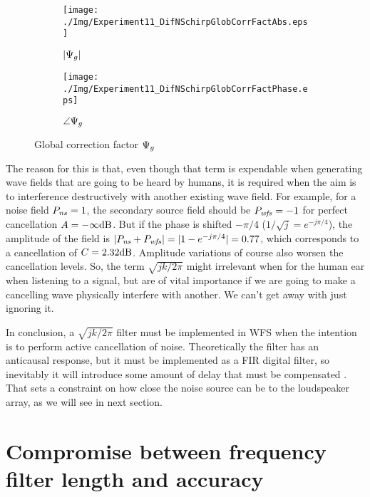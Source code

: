 \begin{figure}[h]
	\begin{subfigure}[b]{0.49\textwidth}
		\centering
		\texttt{[image: ./Img/Experiment11\_DifNSchirpGlobCorrFactAbs.eps]}
		\caption{$|\globalCorrectionFactor|$}
		\label{GlobalCorrFactAbs}
	\end{subfigure}
	\begin{subfigure}[b]{0.49\textwidth}
		\centering
		\texttt{[image: ./Img/Experiment11\_DifNSchirpGlobCorrFactPhase.eps]}
		\caption{$\angle{\globalCorrectionFactor}$}
		\label{GlobalCorrFactPhase}
	\end{subfigure}
\caption{Global correction factor $\globalCorrectionFactor$}
\label{GlobalCorrFact}
\end{figure}

The reason for this is that, even though that term is expendable when generating wave fields that are going to be heard by humans, it is required when the aim is to interference destructively with another existing wave field. For example, for a noise field $\Field[ns][frequency] = 1$, the secondary source field should be $\Field[wfs][frequency] = -1$ for perfect cancellation $\attenuation = -\infty \si{dB}$. But if the phase is shifted $-\pi/4$ ($1/\sqrt{j} = e^{-j\pi/4}$), the amplitude of the field is $|\Field[ns][frequency] + \Field[wfs][frequency]| = |1 - e^{-j\pi/4}| = 0.77$, which corresponds to a cancellation of $\cancellation = 2.32\si{dB}$. Amplitude variations of course also worsen the cancellation levels. So, the term $\sqrt{jk/2\pi}$ might irrelevant when for the human ear when listening to a signal, but are of vital importance if we are going to make a cancelling wave physically interfere with another. We can't get away with just ignoring it.

In conclusion, a $\sqrt{jk/2\pi}$ filter must be implemented in WFS when the intention is to perform active cancellation of noise. Theoretically the filter has an anticausal response, but it must be implemented as a FIR digital filter, so inevitably it will introduce some amount of delay that must be compensated \cite{Lapini2018}. That sets a constraint on how close the noise source can be to the loudspeaker array, as we will see in next section.

\section{Compromise between frequency filter length and accuracy}\label{}


